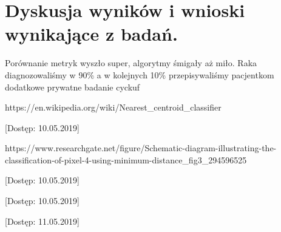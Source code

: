 \documentclass[12pt]{article}
\begin{document}

\section{Dyskusja wyników i wnioski wynikające z badań.}

Porównanie metryk wyszło super, algorytmy śmigały aż miło. Raka diagnozowaliśmy w 90\% a w kolejnych 10\% przepisywaliśmy pacjentkom dodatkowe prywatne badanie cyckuf



\newpage
\renewcommand\refname{Bibliografia}
\begin{thebibliography}{9}

  https://en.wikipedia.org/wiki/Nearest\_centroid\_classifier

[Dostęp: 10.05.2019]

  https://www.researchgate.net/figure/Schematic-diagram-illustrating-the-classification-of-pixel-4-using-minimum-distance\_fig3\_294596525

[Dostęp: 10.05.2019]


[Dostęp: 10.05.2019]

[Dostęp: 11.05.2019]

\end{thebibliography}
\end{document}
